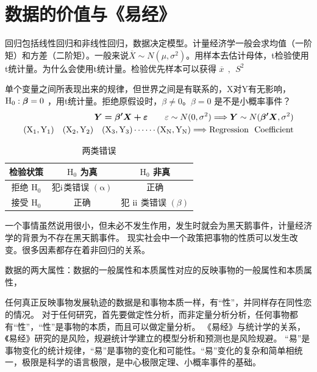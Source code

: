 \section{数据的价值与《易经》}
回归包括线性回归和非线性回归，数据决定模型。计量经济学一般会求均值（一阶矩）和方差（二阶矩）。一般来说$ \overline{X}  \sim  N(\mu,\sigma^2) $。用样本去估计母体，t检验使用t统计量。为什么会使用t统计量。检验优先样本可以获得 $ \overline{x} \ \  , \ \   S^2 $

单个变量之间所表现出来的规律，但世界之间是有联系的，X对Y有无影响，$ \rm H_{0} : \boldsymbol{\beta} = 0 $ ，用t统计量。拒绝原假设时，$ \beta \neq 0 $。$ \beta = 0 $ 是不是小概率事件？
\begin{eqnarray}
	\boldsymbol{ Y  = \beta^{\prime} X + \varepsilon } \qquad  \varepsilon \sim N(0,\sigma^ 2) 
	\Longrightarrow \boldsymbol{Y} \sim N( \boldsymbol{\beta^{\prime} X},\sigma^ 2)   \notag \\ 
	\rm (X_1,Y_1) \quad  (X_2,Y_2) \quad  (X_3,Y_3)  \cdots \cdots (X_N,Y_N) 
	\Longrightarrow Regression \ \ Coefficient  \notag
\end{eqnarray}
	\begin{table}[htb!]
	\caption{两类错误}
	\centering
	\songti
	\begin{tabular}{c|c|c}
		\hline 检验状策 & $\mathrm{H}_{0}$ 为真 & $\mathrm{H}_{0}$ 非真 \\
		\hline 拒绝 $\mathrm{H}_{0}$ & 犯$ \rm\uppercase\expandafter{\romannumeral 1}$类错误 $(\mathrm{\alpha})$ & 正确 \\
		\hline 接受 $\mathrm{H}_{0}$ & 正确 & 犯 $ \rm\uppercase\expandafter{\romannumeral 2}$ 类错误 $(\beta)$ \\
		\hline
	\end{tabular}
    \end{table}

一个事情虽然说用很小，但未必不发生作用，发生时就会为黑天鹅事件，计量经济学的背景为不存在黑天鹅事件。
现实社会中一个政策把事物的性质可以发生改变。很多因素都存在着非回归的关系。

数据的两大属性：数据的一般属性和本质属性对应的反映事物的一般属性和本质属性，

任何真正反映事物发展轨迹的数据是和事物本质一样，有“性”，并同样存在同性恋的情况。
对于任何研究，首先要做定性分析，而非定量分析分析，任何事物都有“性”，“性”是事物的本质，而且可以做定量分析。
《易经》与统计学的关系，《易经》研究的是风险，规避统计学建立的模型分析和预测也是风险规避。
“易”是事物变化的统计规律，“易”是事物的变化和可能性。“易”变化的复杂和简单相统一，极限是科学的语言极限，是中心极限定理、小概率事件的基础。

